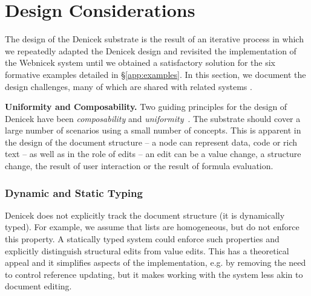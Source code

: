 \documentclass[sigconf]{acmart}
\DeclareRobustCommand{\keyideabox}[3]
{\vspace{\dimexpr\baselineskip\relax} \colorbox{gray!20}{
\parbox{\dimexpr\columnwidth-\marginparsep-10pt\relax}
{\small {#1} \textbf{#2.} #3}
}}
\begin{document}

\section{Design Considerations}
\label{sec:discuss}

The design of the Denicek substrate is the result of an iterative process in which we repeatedly
adapted the Denicek design and revisited the implementation of the Webnicek system until we obtained
a satisfactory solution for the six formative examples detailed in \S\ref{app:examples}. In this
section, we document the design challenges, many of which are shared with related systems
\cite{jakubovic-2022-ladder,edwards-2005-subtext,hall-2017-infra,omar-2021-livelits}.

\keyideabox{\faCubes}{Uniformity and Composability}{
Two guiding principles for the design of Denicek have been \emph{composability} and
\emph{uniformity}~\cite{jakubovic-2023-techdims}. The substrate should cover a large number of
scenarios using a small number of concepts. This is apparent in the design of the document
structure -- a node can represent data, code or rich text -- as well as in the role of
edits -- an edit can be a value change, a structure change, the result of user interaction
or the result of formula evaluation.
}


\subsubsection*{Dynamic and Static Typing}
Denicek does not explicitly track the document structure (it is dynamically typed). For example, we
assume that lists are homogeneous, but do not enforce this property. A statically typed system could
enforce such properties and explicitly distinguish structural edits from value edits. This has a
theoretical appeal and it simplifies aspects of the implementation, e.g. by removing the need to
control reference updating, but it makes working with the system less akin to document editing.
\end{document}
